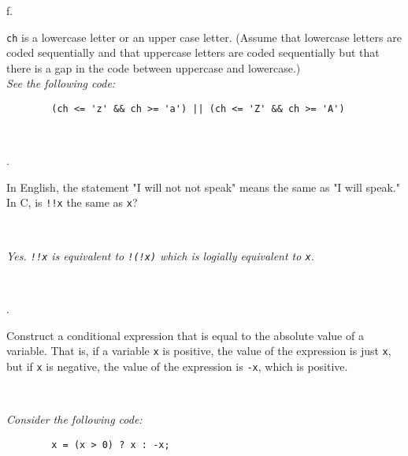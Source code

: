 \documentclass{amsart}
\begin{document}
\phantom{1. }f. 
\begin{minipage}[t]{11.5 cm}
	\texttt{ch} is a lowercase letter or an upper case letter. (Assume that lowercase letters are coded sequentially and that uppercase letters are coded sequentially but that there is a gap in the code between uppercase and lowercase.) \\[1ex]
	{\slshape See the following code:}
	\begin{verbatim}
		(ch <= 'z' && ch >= 'a') || (ch <= 'Z' && ch >= 'A')
	\end{verbatim}
	{} %
\end{minipage}
\\[.2cm]
\vfill


. 
\begin{minipage}[t]{11.5 cm}
	In English, the statement "I will not not speak" means the same as "I will speak." In C\raisebox{.15em}{++}, is \texttt{!!x} the same as \texttt{x}?
\end{minipage} \\[1ex]
\phantom{3. } 
\begin{minipage}[t]{11.5 cm}
	{\slshape Yes. \verb+!!x+ is equivalent to \verb+!(!x)+ which is logially equivalent to \verb+x+.} 
\end{minipage} 
\\[.2cm]
\vfill

. 
\begin{minipage}[t]{11.5 cm}
	Construct a conditional expression that is equal to the absolute value of a variable. That is, if a variable \texttt{x} is positive, the value of the expression is just \texttt{x}, but if \texttt{x} is negative, the value of the expression is \texttt{-x}, which is positive.
\end{minipage} \\[1ex]
\phantom{3. } 
\begin{minipage}[t]{11.5 cm}
	{\slshape Consider the following code:}
	\begin{verbatim}
		x = (x > 0) ? x : -x; 
	\end{verbatim}
\end{minipage} 
\\[.2cm]
\vfill
\end{document}
